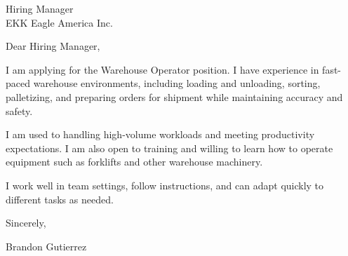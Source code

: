 \documentclass[11pt]{letter}
\begin{document}
\begin{letter}{Hiring Manager \\ EKK Eagle America Inc.}

\opening{Dear Hiring Manager,}

I am applying for the Warehouse Operator position. I have experience in fast-paced warehouse environments, including loading and unloading, sorting, palletizing, and preparing orders for shipment while maintaining accuracy and safety.

I am used to handling high-volume workloads and meeting productivity expectations. I am also open to training and willing to learn how to operate equipment such as forklifts and other warehouse machinery.

I work well in team settings, follow instructions, and can adapt quickly to different tasks as needed.

\closing{Sincerely,}

\vspace{1em}
Brandon Gutierrez

\end{letter}
\end{document}
